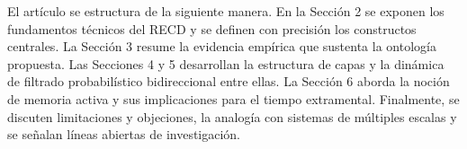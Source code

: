 El artículo se estructura de la siguiente manera. En la Sección 2 se exponen los fundamentos técnicos del RECD y se definen con precisión los constructos centrales. La Sección 3 resume la evidencia empírica que sustenta la ontología propuesta. Las Secciones 4 y 5 desarrollan la estructura de capas y la dinámica de filtrado probabilístico bidireccional entre ellas. La Sección 6 aborda la noción de memoria activa y sus implicaciones para el tiempo extramental. Finalmente, se discuten limitaciones y objeciones, la analogía con sistemas de múltiples escalas y se señalan líneas abiertas de investigación.